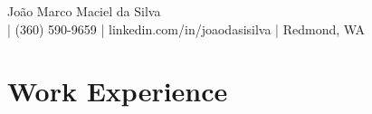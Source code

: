 \documentclass[letterpaper,11pt]{article}
\begin{document}
\begin{center}
  {\Large João Marco Maciel da Silva}\\[5pt]
  {\small \EMAIL{} | (360) 590-9659 | linkedin.com/in/joaodasisilva | Redmond, WA}\\[5pt]
\end{center}


\section{Work Experience}









\end{document}
